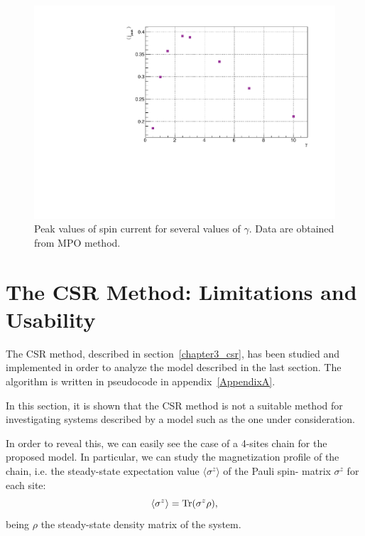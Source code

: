\begin{figure}[H]
    \centering
    \includegraphics[scale=0.7]{Figures/PeakValueSpinCurrVSgamma_8sites.pdf}
    \captionsetup{width=1.\linewidth}
    \caption{Peak values of spin current for several values of $\gamma$. Data are obtained from MPO method.}
    \label{fig:PeakValueSpinCurrVSgamma_8sites}
\end{figure}


\section{The CSR Method: Limitations and Usability}
The CSR method, described in section~\ref{chapter3_csr}, has been studied and implemented in order to analyze the model described in the last section. The algorithm is written in pseudocode in appendix~\ref{AppendixA}.

In this section, it is shown that the CSR method is not a suitable method for investigating systems described by a model such as the one under consideration.

In order to reveal this, we can easily see the case of a 4-sites chain for the proposed model. In particular, we can study the magnetization profile of the chain, i.e. the steady-state expectation value $\langle \sigma^z \rangle$ of the Pauli spin- matrix $\sigma^z$ for each site:
\begin{equation*}
    \langle \sigma^z \rangle = \operatorname{Tr}(\sigma^z \rho),
\end{equation*}
being $\rho$ the steady-state density matrix of the system.

